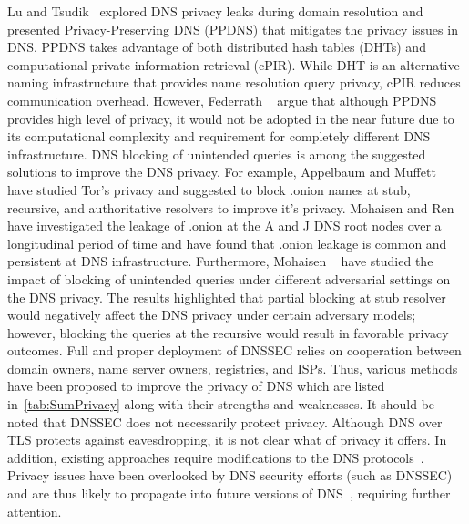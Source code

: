 Lu and Tsudik~ explored DNS privacy leaks during domain resolution and presented Privacy-Preserving DNS (PPDNS) that mitigates the privacy issues in DNS. PPDNS takes advantage of both distributed hash tables (DHTs) and computational private information retrieval (cPIR). While DHT is an alternative naming infrastructure that provides name resolution query privacy, cPIR reduces communication overhead. However, Federrath \etal~ argue that although PPDNS provides high level of privacy, it would not be adopted in the near future due to its computational complexity and requirement for completely different DNS infrastructure. 
DNS blocking of unintended queries is among the suggested solutions to improve the DNS privacy. For example, Appelbaum and Muffett~ have studied Tor's privacy and suggested to block .onion names at stub, recursive, and authoritative resolvers to improve it's privacy. Mohaisen and Ren~ have investigated the leakage of .onion at the A and J DNS root nodes over a longitudinal period of time and have found that .onion leakage is common and persistent at DNS infrastructure. Furthermore, Mohaisen \etal~ have studied the impact of blocking of unintended queries under different adversarial settings on the DNS privacy. The results highlighted that partial blocking at stub resolver would negatively affect the DNS privacy under certain adversary models; however, blocking the queries at the recursive would result in favorable privacy outcomes. 
 Full and proper deployment of DNSSEC relies on cooperation between domain owners, name server owners, registries, and ISPs. Thus, various methods have been proposed to improve the privacy of DNS which are listed in~\autoref{tab:SumPrivacy} along with their strengths and weaknesses.  It should be noted that DNSSEC does not necessarily protect privacy. 
Although DNS over TLS protects against eavesdropping, it is not clear what  of privacy it offers. In addition, existing approaches require modifications to the DNS protocols~. Privacy issues have been overlooked by DNS security efforts (such as DNSSEC) and are thus likely to propagate into future versions of DNS~, requiring further attention.
